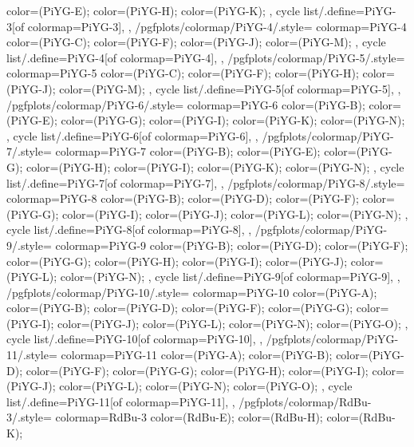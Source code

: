 {{{      color=(PiYG-E);
      color=(PiYG-H);
      color=(PiYG-K);
    },
    cycle list/.define={PiYG-3}{[of colormap=PiYG-3]},
  },
  /pgfplots/colormap/PiYG-4/.style={
    colormap={PiYG-4}{
      color=(PiYG-C);
      color=(PiYG-F);
      color=(PiYG-J);
      color=(PiYG-M);
    },
    cycle list/.define={PiYG-4}{[of colormap=PiYG-4]},
  },
  /pgfplots/colormap/PiYG-5/.style={
    colormap={PiYG-5}{
      color=(PiYG-C);
      color=(PiYG-F);
      color=(PiYG-H);
      color=(PiYG-J);
      color=(PiYG-M);
    },
    cycle list/.define={PiYG-5}{[of colormap=PiYG-5]},
  },
  /pgfplots/colormap/PiYG-6/.style={
    colormap={PiYG-6}{
      color=(PiYG-B);
      color=(PiYG-E);
      color=(PiYG-G);
      color=(PiYG-I);
      color=(PiYG-K);
      color=(PiYG-N);
    },
    cycle list/.define={PiYG-6}{[of colormap=PiYG-6]},
  },
  /pgfplots/colormap/PiYG-7/.style={
    colormap={PiYG-7}{
      color=(PiYG-B);
      color=(PiYG-E);
      color=(PiYG-G);
      color=(PiYG-H);
      color=(PiYG-I);
      color=(PiYG-K);
      color=(PiYG-N);
    },
    cycle list/.define={PiYG-7}{[of colormap=PiYG-7]},
  },
  /pgfplots/colormap/PiYG-8/.style={
    colormap={PiYG-8}{
      color=(PiYG-B);
      color=(PiYG-D);
      color=(PiYG-F);
      color=(PiYG-G);
      color=(PiYG-I);
      color=(PiYG-J);
      color=(PiYG-L);
      color=(PiYG-N);
    },
    cycle list/.define={PiYG-8}{[of colormap=PiYG-8]},
  },
  /pgfplots/colormap/PiYG-9/.style={
    colormap={PiYG-9}{
      color=(PiYG-B);
      color=(PiYG-D);
      color=(PiYG-F);
      color=(PiYG-G);
      color=(PiYG-H);
      color=(PiYG-I);
      color=(PiYG-J);
      color=(PiYG-L);
      color=(PiYG-N);
    },
    cycle list/.define={PiYG-9}{[of colormap=PiYG-9]},
  },
  /pgfplots/colormap/PiYG-10/.style={
    colormap={PiYG-10}{
      color=(PiYG-A);
      color=(PiYG-B);
      color=(PiYG-D);
      color=(PiYG-F);
      color=(PiYG-G);
      color=(PiYG-I);
      color=(PiYG-J);
      color=(PiYG-L);
      color=(PiYG-N);
      color=(PiYG-O);
    },
    cycle list/.define={PiYG-10}{[of colormap=PiYG-10]},
  },
  /pgfplots/colormap/PiYG-11/.style={
    colormap={PiYG-11}{
      color=(PiYG-A);
      color=(PiYG-B);
      color=(PiYG-D);
      color=(PiYG-F);
      color=(PiYG-G);
      color=(PiYG-H);
      color=(PiYG-I);
      color=(PiYG-J);
      color=(PiYG-L);
      color=(PiYG-N);
      color=(PiYG-O);
    },
    cycle list/.define={PiYG-11}{[of colormap=PiYG-11]},
  },
  /pgfplots/colormap/RdBu-3/.style={
    colormap={RdBu-3}{
      color=(RdBu-E);
      color=(RdBu-H);
      color=(RdBu-K);
}}}
